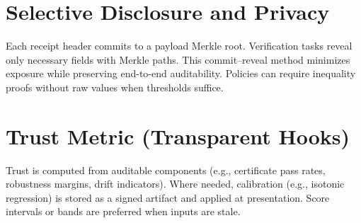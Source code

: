 \documentclass[11pt,a4paper]{article}
\numberwithin{equation}{section}
\theoremstyle{plain}
\theoremstyle{definition}
\theoremstyle{remark}
\begin{document}
\section{Selective Disclosure and Privacy}
Each receipt header commits to a payload Merkle root. Verification tasks reveal only necessary fields with Merkle paths. This commit–reveal method minimizes exposure while preserving end-to-end auditability. Policies can require inequality proofs without raw values when thresholds suffice.

\section{Trust Metric (Transparent Hooks)}
Trust is computed from auditable components (e.g., certificate pass rates, robustness margins, drift indicators). Where needed, calibration (e.g., isotonic regression) is stored as a signed artifact and applied at presentation. Score intervals or bands are preferred when inputs are stale.
\end{document}
